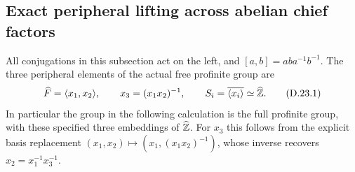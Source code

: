 \subsection{Exact peripheral lifting across abelian chief factors}

All conjugations in this subsection act on the left, and
$[a,b]=aba^{-1}b^{-1}$.  The three peripheral elements of the actual
free profinite group are
\[
 \widehat F=\langle x_1,x_2\rangle,\qquad x_3=(x_1x_2)^{-1},
 \qquad S_i=\overline{\langle x_i\rangle}\simeq\widehat{\mathbb Z}.
 \tag{D.23.1}
\]
In particular the group in the following calculation is the full
profinite group, with these specified three embeddings of
$\widehat{\mathbb Z}$.  For $x_3$ this follows from the explicit basis
replacement $(x_1,x_2)\mapsto(x_1,(x_1x_2)^{-1})$, whose inverse
recovers $x_2=x_1^{-1}x_3^{-1}$.

